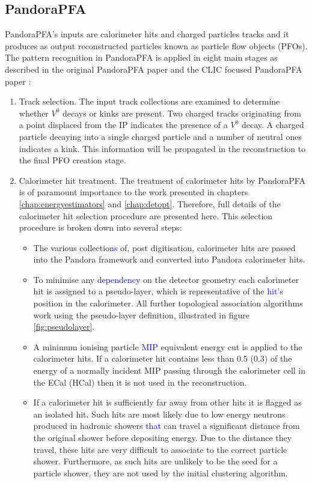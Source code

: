 \subsection{PandoraPFA}
PandoraPFA's inputs are calorimeter hits and charged particles tracks and it produces as output reconstructed particles known as particle flow objects (PFOs).  The pattern recognition in PandoraPFA is applied in eight main stages as described in the original PandoraPFA paper \cite{arXiv:0907.3577} and the CLIC focused PandoraPFA paper \cite{arXiv:1209.4039}:
\begin{enumerate}
\item Track selection.  The input track collections are examined to determine whether $V^{0}$ decays or kinks are present.  Two charged tracks originating from a point displaced from the IP indicates the presence of a $V^{0}$ decay.  A charged particle decaying into a single charged particle and a number of neutral ones indicates a kink.  This information will be propagated in the reconstruction to the final PFO creation stage.  
\item Calorimeter hit treatment.  The treatment of calorimeter hits by PandoraPFA is of paramount importance to the work presented in chapters \ref{chap:energyestimators} and \ref{chap:detopt}.  Therefore, full details of the calorimeter hit selection procedure are presented here.  This selection procedure is broken down into several steps:
\begin{itemize}
\item The various collection\textcolor{blue}{s} of, post digitisation, calorimeter hits are passed into the Pandora framework and converted into Pandora calorimeter hits.  
\item To minimise any \textcolor{blue}{dependency} on the detector geometry each calorimeter hit is assigned to a pseudo-layer, which is representative of the \textcolor{blue}{hit's} position in the calorimeter.  All further topological association algorithms work using the pseudo-layer definition, illustrated in figure \ref{fig:pseudolayer}.  
\item A minimum ionising particle \textcolor{blue}{MIP} equivalent energy cut is applied to the calorimeter hits.  If a calorimeter hit contains less than 0.5 (0.3) of the energy of a normally incident MIP passing through the calorimeter cell in the ECal (HCal) then it is not used in the reconstruction.  
\item If a calorimeter hit is sufficiently far away from other hits it is flagged as an isolated hit.  Such hits are most likely due to low energy neutrons produced in hadronic showers \textcolor{blue}{that} can travel a significant distance from the original shower before depositing energy.  Due to the distance they travel, these hits are very difficult to associate to the correct particle shower.  Furthermore, as such hits are unlikely to be the seed for a particle shower, they are not used by the initial clustering algorithm.  

\end{itemize}
\end{enumerate}
